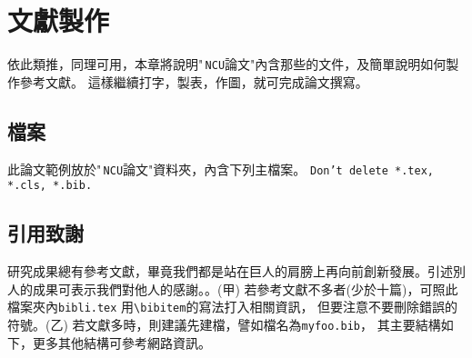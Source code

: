 
\chapter{文獻製作}
依此類推，同理可用，本章將說明"\,{\tt NCU}論文"內含那些的文件，及簡單說明如何製作參考文獻。
這樣繼續打字，製表，作圖，就可完成論文撰寫。
\section{檔案}
此論文範例放於"\,{\tt NCU}論文"資料夾，內含下列主檔案。
  
{\color{red} \Huge \tt Don't delete *.tex, *.cls, *.bib.} 
\section{引用致謝}
研究成果總有參考文獻，畢竟我們都是站在巨人的肩膀上再向前創新發展。引述別人的成果可表示我們對他人的感謝。。(甲)
若參考文獻不多者(少於十篇)，可照此檔案夾內{\tt bibli.tex} 用\verb+\bibitem+的寫法打入相關資訊， 但要注意不要刪除錯誤的符號。(乙) 若文獻多時，則建議先建檔，譬如檔名為{\tt myfoo.bib}， 其主要結構如下，更多其他結構可參考網路資訊。

